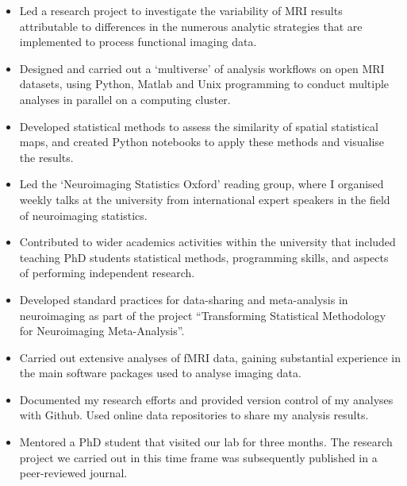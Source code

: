 \documentclass{my_cv}
\begin{document}
%
    {\begin{itemize}[topsep=0pt,itemsep=0pt,partopsep=0pt, parsep=0pt] 
    \item Led a research project to investigate the variability of MRI results attributable to differences in the numerous analytic strategies that are implemented to process functional imaging data. 
    \item Designed and carried out a `multiverse' of analysis workflows on open MRI datasets, using Python, Matlab and Unix programming to conduct multiple analyses in parallel on a computing cluster.
    \item Developed statistical methods to assess the similarity of spatial statistical maps, and created Python notebooks to apply these methods and visualise the results.
    \item Led the `Neuroimaging Statistics Oxford' reading group, where I organised weekly talks at the university from international expert speakers in the field of neuroimaging statistics. 
    \item Contributed to wider academics activities within the university that included teaching PhD students statistical methods, programming skills, and aspects of performing independent research.
    \end{itemize}
    }%

%
    {\begin{itemize}[topsep=0pt,itemsep=0pt,partopsep=0pt, parsep=0pt] 
    \item Developed standard practices for data-sharing and meta-analysis in neuroimaging as part of the project ``Transforming Statistical Methodology for Neuroimaging Meta-Analysis”. 
    \item Carried out extensive analyses of fMRI data, gaining substantial experience in the main software packages used to analyse imaging data.
    \item Documented my research efforts and provided version control of my analyses with Github. Used online data repositories to share my analysis results. 
    \item Mentored a PhD student that visited our lab for three months. The research project we carried out in this time frame was subsequently published in a peer-reviewed journal. 
    \end{itemize}
    }%
     
\end{document}
